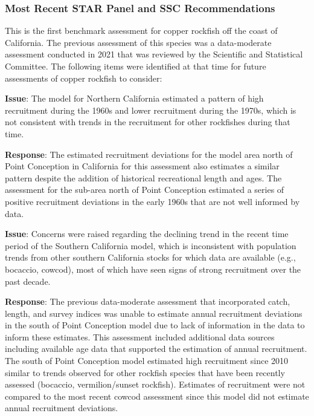 \documentclass[11pt,
  english,
  letterpaper,
]{article}
\begin{document}
\hypertarget{most-recent-star-panel-and-ssc-recommendations}{%
\subsubsection{Most Recent STAR Panel and SSC Recommendations}\label{most-recent-star-panel-and-ssc-recommendations}}

This is the first benchmark assessment for copper rockfish off the coast of California. The previous assessment of this species was a data-moderate assessment conducted in 2021 that was reviewed by the Scientific and Statistical Committee. The following items were identified at that time for future assessments of copper rockfish to consider:

\textbf{Issue}: The model for Northern California estimated a pattern of high recruitment during the 1960s and lower recruitment during the 1970s, which is not consistent with trends in the recruitment for other rockfishes during that time.

\textbf{Response}: The estimated recruitment deviations for the model area north of Point Conception in California for this assessment also estimates a similar pattern despite the addition of historical recreational length and ages. The assessment for the sub-area north of Point Conception estimated a series of positive recruitment deviations in the early 1960s that are not well informed by data.

\textbf{Issue}: Concerns were raised regarding the declining trend in the recent time period of the Southern California model, which is inconsistent with population trends from other southern California stocks for which data are available (e.g., bocaccio, cowcod), most of which have seen signs of strong recruitment over the past decade.

\textbf{Response}: The previous data-moderate assessment that incorporated catch, length, and survey indices was unable to estimate annual recruitment deviations in the south of Point Conception model due to lack of information in the data to inform these estimates. This assessment included additional data sources including available age data that supported the estimation of annual recruitment. The south of Point Conception model estimated high recruitment since 2010 similar to trends observed for other rockfish species that have been recently assessed (bocaccio, vermilion/sunset rockfish). Estimates of recruitment were not compared to the most recent cowcod assessment since this model did not estimate annual recruitment deviations.
\end{document}
